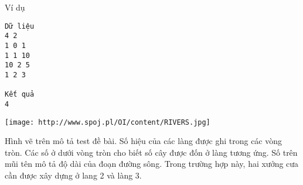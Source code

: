 Ví dụ
\begin{verbatim}
Dữ liệu
4 2
1 0 1
1 1 10
10 2 5
1 2 3

Kết quả
4
\end{verbatim}
\texttt{[image: http://www.spoj.pl/OI/content/RIVERS.jpg]}

   Hình vẽ trên mô tả test đề bài. Số hiệu của các làng được ghi trong các vòng tròn. Các số ở dưới vòng tròn cho biết số cây được đốn ở làng tương ứng. Số trên mũi tên mô tả độ dài của đoạn đường sông. Trong trường hợp này, hai xưởng cưa cần được xây dựng ở lang 2 và làng 3.